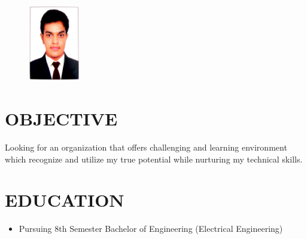 \documentclass{res}
\begin{document}
 


				             

\address{\bf  ADDRESS\\106, Radhe Krishna Appt.,\\Opp. Patel Petrol pump\\Amli, Silvassa\\D\&NH 396230}
\address{\bf CONTACT \\ Mo. : +91 9737191961 \\  E-mail:tnithin28@gmail.com }


                                                         
\begin{resume}
\begin{figure}[h]
\centering
\includegraphics[width=0.2\textwidth, height=0.15\textheight]{photo}
\end{figure}

\section{OBJECTIVE}          
Looking for an organization that offers challenging and learning environment which recognize and utilize my true potential while nurturing my technical skills.


 
\section{EDUCATION}  
\begin{itemize}
\item Pursuing 8th Semester Bachelor of Engineering (Electrical Engineering)
\end{itemize}    
    

\end{resume}
\end{document}
